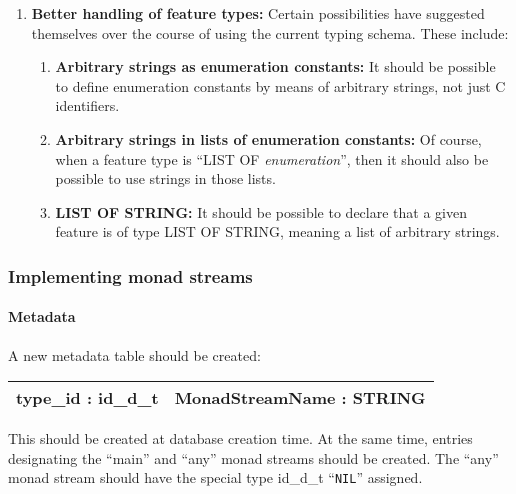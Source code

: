 \documentclass[a4paper,12pt]{article}
\begin{document}
\begin{enumerate}
\item \textbf{Better handling of feature types:} Certain
  possibilities have suggested themselves over the course of using
  the current typing schema.  These include:
  
  \begin{enumerate}
    
  \item \textbf{Arbitrary strings as enumeration constants:} It
    should be possible to define enumeration constants by means of
    arbitrary strings, not just C identifiers.
    
  \item \textbf{Arbitrary strings in lists of enumeration constants:}
    Of course, when a feature type is ``LIST OF
    \textit{enumeration}'', then it should also be possible to use
    strings in those lists.
      
  \item \textbf{LIST OF STRING:} It should be possible to declare that
    a given feature is of type LIST OF STRING, meaning a list of
    arbitrary strings.
      
  \end{enumerate}
  
\end{enumerate}

\subsubsection{Implementing monad streams}

\paragraph{Metadata}

A new metadata table should be created:

\bigskip

  \begin{center}
\noindent\begin{tabular}{|l|l|}
\hline
\textbf{type\_id : id\_d\_t} & \textbf{MonadStreamName : STRING}\\
\hline
\end{tabular}
  \end{center}

\bigskip

\noindent This should be created at database creation time.  At the
same time, entries designating the ``main'' and ``any'' monad streams
should be created.  The ``any'' monad stream should have the special
type id\_d\_t ``\texttt{NIL}'' assigned.
\end{document}
